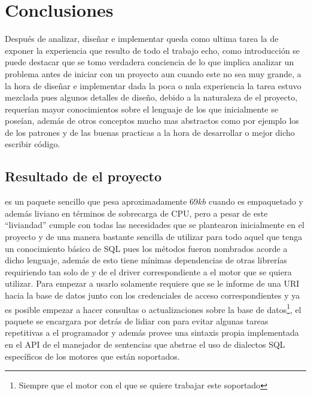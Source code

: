 \chapter*{Conclusiones}
%
%
Después de analizar, diseñar e implementar queda como ultima tarea la de exponer la experiencia que resulto de todo el trabajo echo, como introducción se puede destacar que se tomo verdadera conciencia de lo que implica analizar un problema antes de iniciar con un proyecto aun cuando este no sea muy grande, a la hora de diseñar e implementar dada la poca o nula experiencia la tarea estuvo mezclada pues algunos detalles de diseño, debido a la naturaleza de el proyecto, requerían mayor conocimientos sobre el lenguaje de los que inicialmente se poseían, además de otros conceptos mucho mas abstractos como por ejemplo los de los patrones y de las buenas practicas a la hora de desarrollar o mejor dicho escribir código.
%
%
\section{Resultado de el proyecto}
%
\jj es un paquete sencillo que pesa aproximadamente 69$kb$ cuando es empaquetado y además liviano en términos de sobrecarga de CPU, pero a pesar de este ``liviandad'' cumple con todas las necesidades que se plantearon inicialmente en el proyecto y de una manera bastante sencilla de utilizar para todo aquel que tenga un conocimiento básico de SQL pues los métodos fueron nombrados acorde a dicho lenguaje, además de esto tiene mínimas dependencias de otras librerías requiriendo tan solo de \jd y de el driver correspondiente a el motor que se quiera utilizar. Para empezar a usarlo solamente requiere que se le informe de una URI hacia la base de datos junto con los credenciales de acceso correspondientes y ya es posible empezar a hacer consultas o actualizaciones sobre la base de datos\footnote{Siempre que el motor con el que se quiere trabajar este soportado}, el paquete se encargara por detrás de lidiar con \jd para evitar algunas tareas repetitivas a el programador y además provee una sintaxis propia implementada en el API de el manejador de sentencias que abstrae el uso de dialectos SQL específicos de los motores que están soportados.

